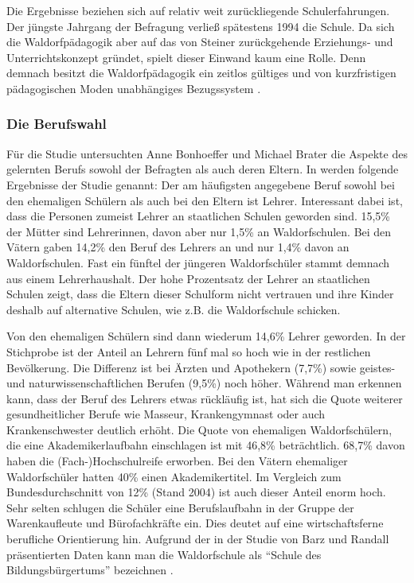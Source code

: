 Die Ergebnisse beziehen sich auf relativ weit zurückliegende Schulerfahrungen. 
Der jüngste Jahrgang der Befragung verließ spätestens 1994 die Schule. 
Da sich die Waldorfpädagogik aber auf das von Steiner zurückgehende Erziehungs- und Unterrichtskonzept gründet, spielt dieser Einwand kaum eine Rolle. 
Denn demnach besitzt die Waldorfpädagogik ein zeitlos gültiges und von kurzfristigen pädagogischen Moden unabhängiges Bezugssystem \citep[vgl.][S. 16]{randoll07}.

\subsubsection{Die Berufswahl}
\label{subsub:Berufswahl}

Für die Studie untersuchten Anne Bonhoeffer und Michael Brater die Aspekte des gelernten Berufs sowohl der Befragten als auch deren Eltern. In \citet[][S. 16f]{randoll07} werden folgende Ergebnisse der Studie genannt: Der am häufigsten angegebene Beruf sowohl bei den ehemaligen Schülern als auch bei den Eltern ist Lehrer. Interessant dabei ist, dass die Personen zumeist Lehrer an staatlichen Schulen geworden sind. 
15,5\% der Mütter sind Lehrerinnen, davon aber nur 1,5\% an Waldorfschulen. Bei den Vätern gaben 14,2\% den Beruf des Lehrers an und nur 1,4\% davon an Waldorfschulen. Fast ein fünftel der jüngeren Waldorfschüler stammt demnach aus einem Lehrerhaushalt. Der hohe Prozentsatz der Lehrer an staatlichen Schulen zeigt, dass die Eltern dieser Schulform nicht vertrauen und ihre Kinder deshalb auf alternative Schulen, wie z.B. die Waldorfschule schicken.

Von den ehemaligen Schülern sind dann wiederum 14,6\% Lehrer geworden. 
In der Stichprobe ist der Anteil an Lehrern fünf mal so hoch wie in der restlichen Bevölkerung. 
Die Differenz ist bei Ärzten und Apothekern (7,7\%) sowie geistes- und naturwissenschaftlichen Berufen (9,5\%) noch höher. 
Während man erkennen kann, dass der Beruf des Lehrers etwas rückläufig ist, hat sich die Quote weiterer gesundheitlicher Berufe wie Masseur, Krankengymnast oder auch Krankenschwester deutlich erhöht. 
Die Quote von ehemaligen Waldorfschülern, die eine Akademikerlaufbahn einschlagen ist mit 46,8\% beträchtlich. 
68,7\% davon haben die (Fach-)Hochschulreife erworben. Bei den Vätern ehemaliger Waldorfschüler hatten 40\% einen Akademikertitel. 
Im Vergleich zum Bundesdurchschnitt von 12\% (Stand 2004) ist auch dieser Anteil enorm hoch. 
Sehr selten schlugen die Schüler eine Berufslaufbahn in der Gruppe der Warenkaufleute und Bürofachkräfte ein. 
Dies deutet auf eine wirtschaftsferne berufliche Orientierung hin. 
Aufgrund der in der Studie von Barz und Randall präsentierten Daten kann man die Waldorfschule als \enquote{Schule des Bildungsbürgertums} bezeichnen \citep[][S. 17]{randoll07}.

